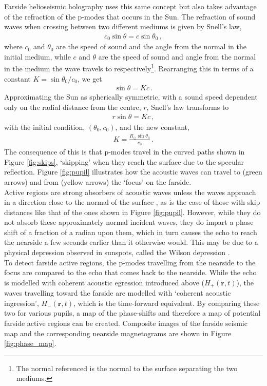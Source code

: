 \documentclass[11pt,a4paper,onecolumn]{report}
\begin{document}
Farside helioseismic holography uses this same concept but also takes advantage of
the refraction of the p-modes that occurs in the Sun. The refraction of sound
waves when crossing between two different mediums is given by Snell's law,
\begin{align}
  c_0 \sin \theta = c \sin \theta_0 \,,
\end{align}
where \(c_0\) and \(\theta_0\) are the speed of sound and the angle from the normal
in the initial medium, while \(c\) and \(\theta\) are the speed of sound and
angle from the normal in the medium the wave travels to
respectively\footnote{The normal referenced is the normal to the surface
separating the two mediums.}. Rearranging this in terms of a constant \(K = \sin
\theta_0 / c_0 \), we get
\begin{align}
  \sin \theta = Kc \,.
\end{align}
Approximating the Sun as spherically symmetric, with a sound speed dependent
only on the radial distance from the centre, \(r\), Snell's law transforms to
\begin{align}
  r\sin \theta = Kc \,,
\end{align}
with the initial condition, \((\theta_0, c_0)\), and the new constant,
\begin{align}
  K = \frac{R_\odot \sin \theta_0}{c_0}\,.
\end{align}
The consequence of this is that p-modes travel in the curved paths shown in
Figure \ref{fig:skips}, `skipping' when they reach the surface due to the
specular reflection. Figure \ref{fig:pupil} illustrates how the acoustic waves
can travel to (green arrows) and from (yellow arrows) the `focus' on the
farside. \\

Active regions are strong absorbers of acoustic waves unless the waves approach
in a direction close to the normal of the surface \citep{Braun1989,
lindsey_seismic_2000, braun_surface-focused_2008}, as is the case of those with
skip distances like that of the ones shown in Figure \ref{fig:pupil}. However,
while they do not absorb these approximately normal incident waves, they do
impart a phase shift of a fraction of a radian upon them, which in turn causes
the echo to reach the nearside a few seconds earlier than it otherwise would.
This may be due to a physical depression observed in sunspots, called the Wilson
depression \citep{Lindsey_2010}.\\

To detect farside active regions, the p-modes travelling
from the nearside to the focus are compared to the echo that comes back to the
nearside. While the echo is modelled with coherent acoustic egression introduced
above (\(H_+(\bm{r}, t)\)), the waves travelling toward the farside are modelled with
`coherent acoustic ingression', \(H_-(\bm{r}, t)\), which is the time-forward
equivalent. By comparing these two for various pupils, a map of the phase-shifts
and therefore a map of potential farside active regions can be created.
Composite images of the farside seismic map and the corresponding nearside
magnetograms are shown in Figure \ref{fig:phase_map}.\\
\end{document}
